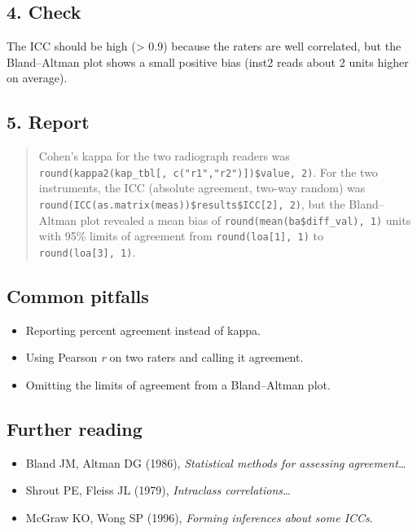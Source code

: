 \documentclass[
]{article}
\providecommand{\tightlist}{%
  \setlength{\itemsep}{0pt}\setlength{\parskip}{0pt}}
\begin{document}
\subsection{4. Check}\label{check}

The ICC should be high (\textgreater{} 0.9) because the raters are well
correlated, but the Bland--Altman plot shows a small positive bias
(inst2 reads about 2 units higher on average).

\subsection{5. Report}\label{report}

\begin{quote}
Cohen's kappa for the two radiograph readers was
\texttt{round(kappa2(kap\_tbl{[},\ c("r1","r2"){]})\$value,\ 2)}. For
the two instruments, the ICC (absolute agreement, two-way random) was
\texttt{round(ICC(as.matrix(meas))\$results\$ICC{[}2{]},\ 2)}, but the
Bland--Altman plot revealed a mean bias of
\texttt{round(mean(ba\$diff\_val),\ 1)} units with 95\% limits of
agreement from \texttt{round(loa{[}1{]},\ 1)} to
\texttt{round(loa{[}3{]},\ 1)}.
\end{quote}

\subsection{Common pitfalls}\label{common-pitfalls}

\begin{itemize}
\tightlist
\item
  Reporting percent agreement instead of kappa.
\item
  Using Pearson \emph{r} on two raters and calling it agreement.
\item
  Omitting the limits of agreement from a Bland--Altman plot.
\end{itemize}

\subsection{Further reading}\label{further-reading}

\begin{itemize}
\tightlist
\item
  Bland JM, Altman DG (1986), \emph{Statistical methods for assessing
  agreement\ldots{}}
\item
  Shrout PE, Fleiss JL (1979), \emph{Intraclass correlations\ldots{}}
\item
  McGraw KO, Wong SP (1996), \emph{Forming inferences about some ICCs}.
\end{itemize}
\end{document}
